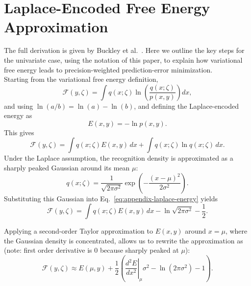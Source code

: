 \section{Laplace-Encoded Free Energy Approximation}
\label{app:laplace-free-energy}

The full derivation is given by Buckley et al.~\cite{buckley_free_2017}. Here we outline the key steps for the univariate case, using the notation of this paper, to explain how variational free energy leads to precision-weighted prediction-error minimization.
\\


Starting from the variational free energy definition,
\begin{equation}
    \mathcal{F}(y,\zeta)
    =
    \int q(x;\zeta)
    \ln
    \left(
        \frac{q(x;\zeta)}{p(x,y)}
    \right) dx ,
\end{equation}
and using $\ln(a/b)=\ln(a)-\ln(b)$, and defining the Laplace-encoded energy as
\begin{equation}
    E(x,y)=-\ln p(x,y).
\end{equation}
This gives
\begin{equation}
    \mathcal{F}(y,\zeta)
    =
    \int q(x;\zeta)E(x,y)\,dx
    +
    \int q(x;\zeta)\ln q(x;\zeta)\,dx .
    \label{eq:appendix-laplace-energy}
\end{equation}
Under the Laplace assumption, the recognition density is approximated as a sharply peaked Gaussian around its mean $\mu$:
\begin{equation}
    q(x;\zeta)
    =
    \frac{1}{\sqrt{2\pi\sigma^2}}
    \exp
    \left(
        -\frac{(x-\mu)^2}{2\sigma^2}
    \right).
\end{equation}
Substituting this Gaussian into Eq.~\ref{eq:appendix-laplace-energy} yields
\begin{equation}
    \mathcal{F}(y,\zeta)
    =
    \int q(x;\zeta)E(x,y)\,dx
    -
    \ln\sqrt{2\pi\sigma^2}
    -
    \frac{1}{2}.
\end{equation}

Applying a second-order Taylor approximation to $E(x,y)$ around
$x=\mu$, where the Gaussian density is concentrated, allows us
to rewrite the approximation as (note: first order derivative is 0 because sharply peaked at $\mu$):
\begin{equation}
    \mathcal{F}(y,\zeta)
    \approx E(\mu,y)
    + \frac{1}{2}\left(
        \left.\frac{d^2E}{dx^2}\right|_{\mu}\sigma^2
        - \ln(2\pi\sigma^2)-1
    \right).
\end{equation}


